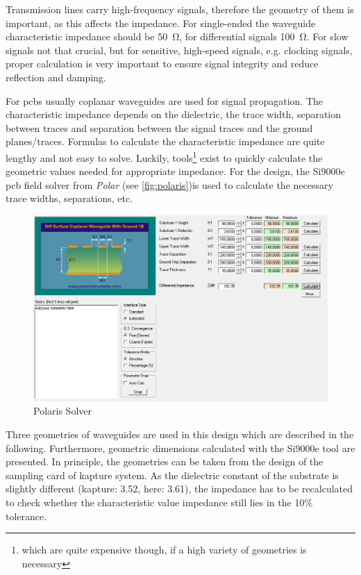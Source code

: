 Transmission lines carry high-frequency signals, therefore the geometry of them is important, as this affects the impedance. For single-ended the waveguide characteristic impedance should be \SI{50}{\ohm}, for differential signals \SI{100}{\ohm}. For slow signals not that crucial, but for sensitive, high-speed signals, e.g. clocking signals, proper calculation is very important to ensure signal integrity and reduce reflection and damping. 

For \glspl{pcb} usually coplanar waveguides are used for signal propagation. The characteristic impedance depends on the dielectric, the trace width, separation between traces and separation between the signal traces and the ground planes/traces. Formulas to calculate the characteristic impedance are quite lengthy and not easy to solve. Luckily, tools\footnote{which are quite expensive though, if a high variety of geometries is necessary} exist to quickly calculate the geometric values needed for appropriate impedance. For the design, the Si9000e \gls{pcb} field solver from \textit{Polar} (see \autoref{fig:polaris})is used to calculate the necessary trace widths, separations, etc.

\begin{figure}[tbh]
	\centering
	\includegraphics[width = \textwidth]{chap/04-work/img/polaris}
	\caption{Polaris Solver}
	\label{fig:polaris}
\end{figure}

Three geometries of waveguides are used in this design which are described in the following. Furthermore, geometric dimensions calculated with the Si9000e tool are presented. In principle, the geometries can be taken from the design of the sampling card of \gls{kapture} system. As the dielectric constant of the substrate is slightly different (\gls{kapture}: 3.52, here: 3.61), the impedance has to be recalculated to check whether the characteristic value impedance still lies in the 10\% tolerance.
